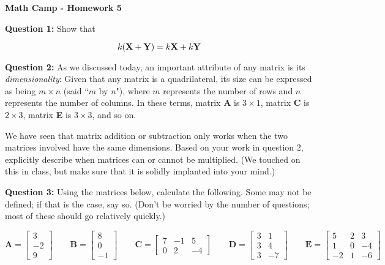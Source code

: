 \documentclass[12pt]{article}
\begin{document}
\centerline{\bf Math Camp - Homework 5}

\bigskip

\textbf{Question 1:} Show that

$$k(\textrm{\textbf{X}} + \textrm{\textbf{Y}}) = k\textrm{\textbf{X}} + k\textrm{\textbf{Y}}$$

\medskip 
\textbf{Question 2:} As we discussed today, an important attribute of any matrix is its {\it dimensionality}: Given that any matrix is a quadrilateral, its size can be expressed as being $m \times n$ (said ``$m$ by $n$"), where $m$ represents the number of rows and $n$ represents the number of columns. In these terms, matrix \textbf{A} is $3 \times 1$, matrix \textbf{C} is $2 \times 3$, matrix \textbf{E} is $3 \times 3$, and so on. 

We have seen that matrix addition or subtraction only works when the two matrices involved have the same dimensions. Based on your work in question 2, explicitly describe when matrices can or cannot be multiplied. (We touched on this in class, but make sure that it is solidly implanted into your mind.)


\medskip

\textbf{Question 3:} Using the matrices below, calculate the following. Some may not be defined; if that is the case, say so. (Don't be worried by the number of questions; most of these should go relatively quickly.)

\begin{equation*}
\textbf{A} = \left[\begin{array}{rrr}
3 \\ -2 \\ 9 
\end{array} \right]
\qquad
\textbf{B} = \left[\begin{array}{rrr} 8\\0\\-1\end{array}\right]
\qquad
\textbf{C} = \left[\begin{array}{rrr}
7 & -1 & 5\\
0 & 2 & -4
\end{array}\right]
\qquad
\textbf{D} = \left[\begin{array}{rrr}
3 & 1\\
3 & 4\\
3 & -7
\end{array}\right]
\qquad
\textbf{E}= \left[\begin{array}{rrr}
5 & 2 & 3\\
1 & 0 & -4\\
-2 & 1 & -6
\end{array}\right]
\end{equation*}
\end{document}
